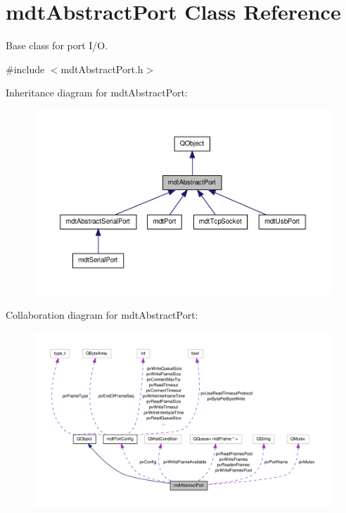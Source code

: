 \hypertarget{classmdt_abstract_port}{\section{mdt\-Abstract\-Port Class Reference}
\label{classmdt_abstract_port}
}


Base class for port I/\-O.  




{\ttfamily \#include $<$mdt\-Abstract\-Port.\-h$>$}



Inheritance diagram for mdt\-Abstract\-Port\-:
\nopagebreak
\begin{figure}[H]
\begin{center}
\leavevmode
\includegraphics[width=350pt]{classmdt_abstract_port__inherit__graph}
\end{center}
\end{figure}


Collaboration diagram for mdt\-Abstract\-Port\-:
\nopagebreak
\begin{figure}[H]
\begin{center}
\leavevmode
\includegraphics[width=350pt]{classmdt_abstract_port__coll__graph}
\end{center}
\end{figure}
